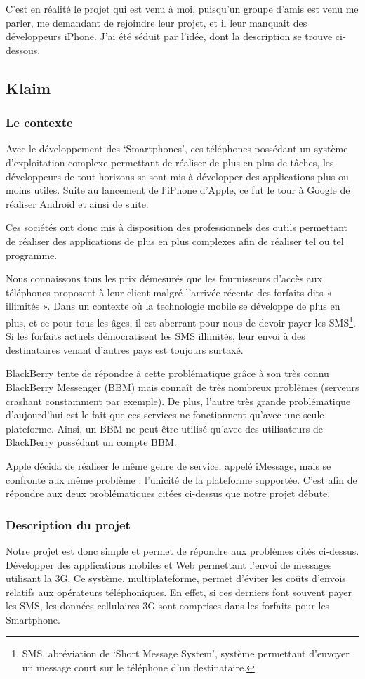 \documentclass{article}
\begin{document}
	C’est en réalité le projet qui est venu à moi, puisqu’un groupe d’amis est venu me parler, me demandant de rejoindre leur projet, et il leur manquait des développeurs iPhone. J’ai été séduit par l’idée, dont la description se trouve ci-dessous.
\subsection{Klaim}
\subsubsection{Le contexte}
	Avec le développement des ‘Smartphones’, ces téléphones possédant un système d’exploitation complexe permettant de réaliser de plus en plus de tâches, les développeurs de tout horizons se sont mis à développer des applications plus ou moins utiles. Suite au lancement de l’iPhone d’Apple, ce fut le tour à Google de réaliser Android et ainsi de suite.
	
	Ces sociétés ont donc mis à disposition des professionnels des outils permettant de réaliser des applications de plus en plus complexes afin de réaliser tel ou tel programme. 
	
	Nous connaissons tous les prix démesurés que les fournisseurs d’accès aux téléphones proposent à leur client malgré l’arrivée récente des forfaits dits « illimités ». Dans un contexte où la technologie mobile se développe de plus en plus, et ce pour tous les âges, il est aberrant  pour nous de devoir payer les SMS\footnote{SMS, abréviation de ‘Short Message System’, système permettant d’envoyer un message court sur le téléphone d’un destinataire.}. Si les forfaits actuels démocratisent les SMS illimités, leur envoi à des destinataires venant d’autres pays est toujours surtaxé. 
	
	BlackBerry tente de répondre à cette problématique grâce à son très connu BlackBerry Messenger (BBM) mais connaît de très nombreux problèmes (serveurs crashant constamment par exemple). De plus, l’autre très grande problématique d’aujourd’hui est le fait que ces services ne fonctionnent qu’avec une seule plateforme. Ainsi, un BBM ne peut-être utilisé qu’avec des utilisateurs de BlackBerry possédant un compte BBM. 
	
	Apple décida de réaliser le même genre de service, appelé iMessage, mais se confronte aux même problème : l’unicité de la plateforme supportée. C’est afin de répondre aux deux problématiques citées ci-dessus que notre projet débute.  

\subsubsection{Description du projet}
	Notre projet est donc simple et permet de répondre aux problèmes cités ci-dessus. Développer des applications mobiles et Web permettant l’envoi de messages utilisant la 3G. Ce système, multiplateforme, permet d’éviter les coûts d’envois relatifs aux opérateurs téléphoniques. En effet, si ces derniers font souvent payer les SMS, les données cellulaires 3G sont comprises dans les forfaits pour les Smartphone.
	
\end{document}
